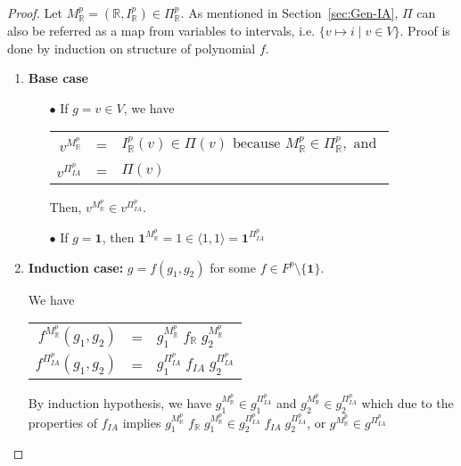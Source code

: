 \begin{proof}
Let $M^p_\mathbb{R} = (\mathbb{R}, I^p_\mathbb{R}) \in \Pi^p_\mathbb{R}$. As mentioned in Section~\ref{sec:Gen-IA}, $\Pi$ can also be referred as a map from variables to intervals, i.e. $\{v \mapsto i \mid v \in V\}$. Proof is done by induction on structure of polynomial $f$.
\begin{enumerate}
\item \textbf{Base case}
\begin{itemize}
\item[$\bullet$] If $g = v \in V$, we have 
\begin{center}
\begin{tabular} {r c l}
$v^{M^p_\mathbb{R}}$ &=& $I^p_\mathbb{R}(v) \in \Pi(v) \text{ because  } M^p_\mathbb{R} \in \Pi^p_\mathbb{R}, \text{ and }$\\ $v^{\Pi^p_{IA}}$ &=& $\Pi(v)$\\
\end{tabular}
\end{center}
Then, $v^{M^p_\mathbb{R}} \in v^{\Pi^p_{IA}}$.

\item[$\bullet$] If $g = \mathbf{1}$, then $\mathbf{1}^{M^p_\mathbb{R}} = 1 \in \langle 1, 1\rangle  = \mathbf{1}^{\Pi^p_{IA}}$
\end{itemize}

\item \textbf{Induction case:} $g = f(g_1, g_2)$ for some $f \in F^p \setminus \{\mathbf{1}\}$.

We have

\begin{center}
\begin{tabular} {r c l}
$f^{M^p_\mathbb{R}}(g_1, g_2)$ &=& $g_1^{M^p_\mathbb{R}} \; f_\mathbb{R} \; g_2^{M^p_\mathbb{R}}$ \\
$f^{\Pi^p_{IA}}(g_1, g_2)$ &=& $g_1^{\Pi^p_{IA}} \; f_{IA} \; g_2^{\Pi^p_{IA}}$
\end{tabular}
\end{center}

By induction hypothesis, we have $g_1^{M^p_\mathbb{R}} \in g_1^{\Pi^p_{IA}}$ and $g_2^{M^p_\mathbb{R}} \in g_2^{\Pi^p_{IA}}$ which due to the properties of $f_{IA}$ implies $g_1^{M^p_\mathbb{R}} \; f_\mathbb{R} \; g_1^{M^p_\mathbb{R}} \in g_2^{\Pi^p_{IA}} \; f_{IA} \; g_2^{\Pi^p_{IA}}$, or $g^{M^p_\mathbb{R}} \in g^{\Pi^p_{IA}}$ 
\end{enumerate}
\end{proof}


